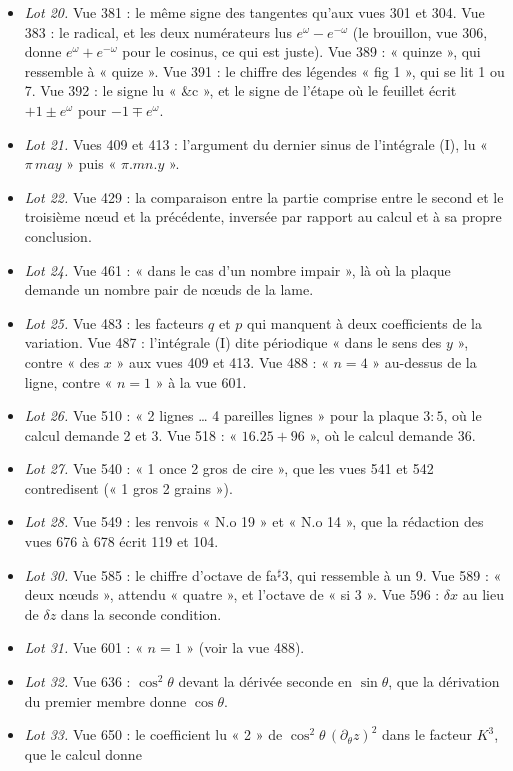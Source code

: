\documentclass[11pt,a4paper]{article}
\begin{document}
\begin{itemize}
\item \emph{Lot 20.} Vue 381 : le même signe des tangentes qu'aux vues 301 et 304.
Vue 383 : le radical, et les deux numérateurs lus $e^{\omega}-e^{-\omega}$ (le
brouillon, vue 306, donne $e^{\omega}+e^{-\omega}$ pour le cosinus, ce qui est
juste). Vue 389 : « quinze », qui ressemble à « quize ». Vue 391 : le chiffre des
légendes « fig 1 », qui se lit 1 ou 7. Vue 392 : le signe lu « \&c », et le signe
de l'étape où le feuillet écrit $+1\pm e^{\omega}$ pour $-1\mp e^{\omega}$.
\item \emph{Lot 21.} Vues 409 et 413 : l'argument du dernier sinus de
l'intégrale (I), lu « $\pi\,may$ » puis « $\pi.mn.y$ ».
\item \emph{Lot 22.} Vue 429 : la comparaison entre la partie comprise entre le
second et le troisième nœud et la précédente, inversée par rapport au calcul et à
sa propre conclusion.
\item \emph{Lot 24.} Vue 461 : « dans le cas d'un nombre impair », là où la plaque
demande un nombre pair de nœuds de la lame.
\item \emph{Lot 25.} Vue 483 : les facteurs $q$ et $p$ qui manquent à deux
coefficients de la variation. Vue 487 : l'intégrale (I) dite périodique « dans le
sens des $y$ », contre « des $x$ » aux vues 409 et 413. Vue 488 : « $n=4$ »
au-dessus de la ligne, contre « $n=1$ » à la vue 601.
\item \emph{Lot 26.} Vue 510 : « 2 lignes … 4 pareilles lignes » pour la plaque
$3:5$, où le calcul demande 2 et 3. Vue 518 : « $16.25+96$ », où le calcul
demande $36$.
\item \emph{Lot 27.} Vue 540 : « 1 once 2 gros de cire », que les vues 541 et 542
contredisent (« 1 gros 2 grains »).
\item \emph{Lot 28.} Vue 549 : les renvois « N.o 19 » et « N.o 14 », que la
rédaction des vues 676 à 678 écrit 119 et 104.
\item \emph{Lot 30.} Vue 585 : le chiffre d'octave de fa$^{\sharp}$3, qui
ressemble à un 9. Vue 589 : « deux nœuds », attendu « quatre », et l'octave de
« si 3 ». Vue 596 : $\delta x$ au lieu de $\delta z$ dans la seconde condition.
\item \emph{Lot 31.} Vue 601 : « $n=1$ » (voir la vue 488).
\item \emph{Lot 32.} Vue 636 : $\cos^2\theta$ devant la dérivée seconde en
$\sin\theta$, que la dérivation du premier membre donne $\cos\theta$.
\item \emph{Lot 33.} Vue 650 : le coefficient lu « 2 » de
$\cos^2\theta\,(\partial_\theta z)^2$ dans le facteur $K^3$, que le calcul donne

\end{itemize}
\end{document}
